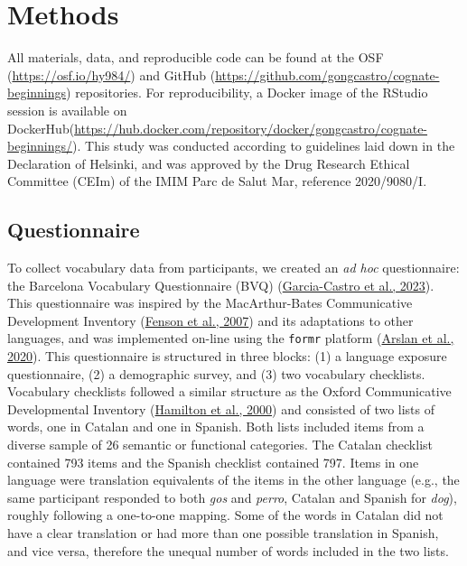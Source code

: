 \documentclass[
]{article}
\begin{document}
\hypertarget{sec-methods}{%
\section{Methods}\label{sec-methods}}

All materials, data, and reproducible code can be found at the OSF
(\url{https://osf.io/hy984/}) and GitHub
(\url{https://github.com/gongcastro/cognate-beginnings}) repositories.
For reproducibility, a Docker image of the RStudio session is available
on
DockerHub(\url{https://hub.docker.com/repository/docker/gongcastro/cognate-beginnings/}).
This study was conducted according to guidelines laid down in the
Declaration of Helsinki, and was approved by the Drug Research Ethical
Committee (CEIm) of the IMIM Parc de Salut Mar, reference 2020/9080/I.

\hypertarget{sec-questionnaire}{%
\subsection{Questionnaire}\label{sec-questionnaire}}

To collect vocabulary data from participants, we created an \emph{ad
hoc} questionnaire: the Barcelona Vocabulary Questionnaire (BVQ)
(\protect\hyperlink{ref-garcia-castro2023bvq}{Garcia-Castro et al.,
2023}). This questionnaire was inspired by the MacArthur-Bates
Communicative Development Inventory
(\protect\hyperlink{ref-fenson2007macarthurbates}{Fenson et al., 2007})
and its adaptations to other languages, and was implemented on-line
using the \texttt{formr} platform
(\protect\hyperlink{ref-arslan2020formr}{Arslan et al., 2020}). This
questionnaire is structured in three blocks: (1) a language exposure
questionnaire, (2) a demographic survey, and (3) two vocabulary
checklists. Vocabulary checklists followed a similar structure as the
Oxford Communicative Developmental Inventory
(\protect\hyperlink{ref-hamilton2000infant}{Hamilton et al., 2000}) and
consisted of two lists of words, one in Catalan and one in Spanish. Both
lists included items from a diverse sample of 26 semantic or functional
categories. The Catalan checklist contained 793 items and the Spanish
checklist contained 797. Items in one language were translation
equivalents of the items in the other language (e.g., the same
participant responded to both \emph{gos} and \emph{perro}, Catalan and
Spanish for \emph{dog}), roughly following a one-to-one mapping. Some of
the words in Catalan did not have a clear translation or had more than
one possible translation in Spanish, and vice versa, therefore the
unequal number of words included in the two lists.
\end{document}
